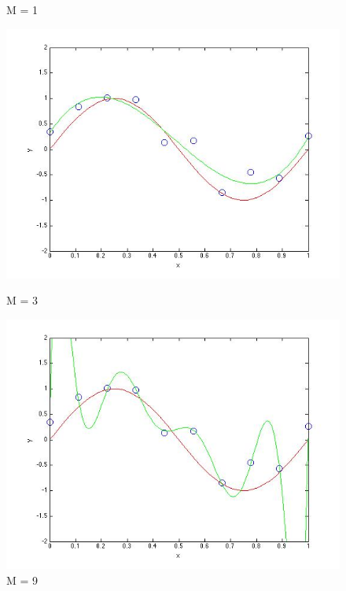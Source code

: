 \begin{figure}[!htb]
  \caption{M = 1}\label{fig:figures/p2_M=1}
\endminipage\hfill
{}                                                                            
  \includegraphics[width=\linewidth]{figures/p2_M=3}
  \caption{M = 3}\label{fig:figures/p2_M=3}
\endminipage\hfill
{}                                                                            
  \includegraphics[width=\linewidth]{figures/p2_M=9}
  \caption{M = 9}\label{fig:figures/p2_M=9}
\endminipage\hfill
\end{figure}


